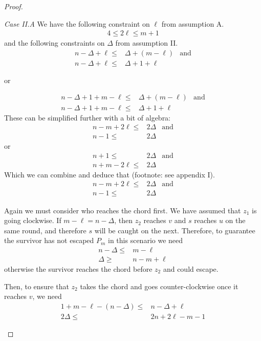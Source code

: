 \documentclass[letterpaper, 10pt]{article}
\begin{document}
\begin{proof}
\begin{proofpart}
  \textit{Case II.A} We have the following constraint on $\ell$ from
  assumption A.
  \begin{align*}
   4 \leq 2 \ell \leq m + 1
  \end{align*}
  and the following constraints on $\Delta$ from assumption II.
  \begin{align*}
   n - \Delta + \ell \leq & \Delta + (m - \ell) & \text{and} \\
   n - \Delta + \ell \leq & \Delta + 1 + \ell
  \end{align*}
  \begin{center}or\end{center}
  \begin{align*}
   n - \Delta + 1 + m - \ell \leq & \Delta + (m - \ell) & \text{and} \\
   n - \Delta + 1 + m - \ell \leq & \Delta + 1 + \ell
  \end{align*}
  These can be simplified further with a bit of algebra:
  \begin{align*}
   n-m +2\ell \leq & 2 \Delta & \text{and} \\
   n-1 \leq        & 2\Delta
  \end{align*}
  or
  \begin{align*}
   n + 1 \leq         & 2 \Delta & \text{and} \\
   n + m - 2\ell \leq & 2 \Delta
  \end{align*}
  Which we can combine and deduce that (footnote: see appendix I).
  \begin{align*}
   n -m + 2\ell \leq & 2 \Delta & \text{and} \\
   n-1 \leq          & 2 \Delta
  \end{align*}

  Again we must consider who reaches the chord first. We have assumed that $z_1$ is going clockwise. If $m - \ell = n - \Delta$, then $z_2$ reaches $v$ and $s$ reaches $u$ on the same round, and therefore $s$ will be caught on the next. Therefore, to guarantee the survivor has not escaped $P_m$ in this scenario we need
  \begin{align*}
   n - \Delta \leq & m - \ell     \\
   \Delta \geq     & n - m + \ell
  \end{align*}
  otherwise the survivor reaches the chord before $z_2$ and
  could escape.

  Then, to ensure that $z_2$ takes the chord and goes counter-clockwise once
  it reaches $v$, we need
  \begin{align*}
   1 + m - \ell - (n - \Delta) \leq & n - \Delta + \ell  \\
   2 \Delta \leq                    & 2n + 2\ell - m - 1
  \end{align*}


\end{proofpart}
\end{proof}
\end{document}
